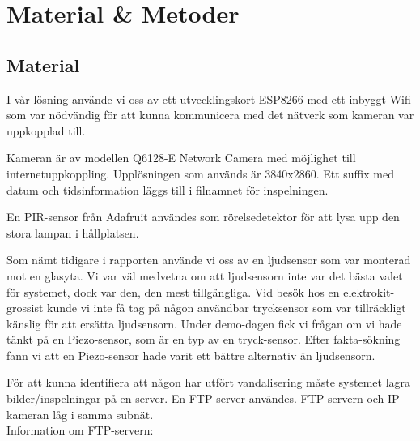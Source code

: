 



\chapter{Material \& Metoder} %
\label{ch:metoder}


\ifpdf
    \graphicspath{{8/figures/PNG/}{8_materials_and_methods/figures/PDF/}{8_materials_and_methods/figures/}}
\else
    \graphicspath{{8/figures/EPS/}{8_materials_and_methods/figures/}}
\fi


\section{Material}
I vår lösning använde vi oss av ett utvecklingskort ESP8266 med ett inbyggt Wifi som var nödvändig för att kunna kommunicera med det nätverk som kameran var uppkopplad till.

Kameran är av modellen Q6128-E Network Camera med möjlighet till internetuppkoppling. Upplösningen som används är 3840x2860. Ett suffix med datum och tidsinformation läggs till i filnamnet för inspelningen.

En PIR-sensor från Adafruit användes som rörelsedetektor för att lysa upp den stora lampan i hållplatsen.

Som nämt tidigare i rapporten använde vi oss av en ljudsensor som var monterad mot en glasyta. Vi var väl medvetna om att ljudsensorn inte var det bästa valet för systemet, dock var den, den mest tillgängliga. Vid besök hos en elektrokit-grossist kunde vi inte få tag på någon användbar trycksensor som var tillräckligt känslig för att ersätta ljudsensorn. Under demo-dagen fick vi frågan om vi hade tänkt på en Piezo-sensor, som är en typ av en tryck-sensor. Efter fakta-sökning fann vi att en Piezo-sensor hade varit ett bättre alternativ än ljudsensorn.

För att kunna identifiera att någon har utfört vandalisering måste systemet lagra bilder/inspelningar på en server. En FTP-server användes. FTP-servern och IP-kameran låg i samma subnät.\\

Information om FTP-servern:

